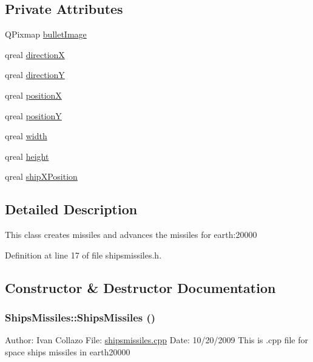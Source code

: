 \subsection*{Private Attributes}
\begin{DoxyCompactItemize}
\item 
QPixmap \hyperlink{class_ships_missiles_a4c2fdc36a57d2e2cd4676f254aaa84d8}{bulletImage}
\item 
qreal \hyperlink{class_ships_missiles_aad45d407d327d29bd616ca336197fe30}{directionX}
\item 
qreal \hyperlink{class_ships_missiles_af7e77e3dd68cb9f8d6cb90467a2a3ff0}{directionY}
\item 
qreal \hyperlink{class_ships_missiles_ad7c34c9db83c3ed6ecca7ec25c119123}{positionX}
\item 
qreal \hyperlink{class_ships_missiles_ace3adf616edc81579fcfd0b2dc76496f}{positionY}
\item 
qreal \hyperlink{class_ships_missiles_a335b53cf15200f696ba3c8cdd9b38d85}{width}
\item 
qreal \hyperlink{class_ships_missiles_a1a31e013e3e81f518aa8f99bbb684357}{height}
\item 
qreal \hyperlink{class_ships_missiles_a728619287aa81ab7bcbdbd034d1c3c8a}{shipXPosition}
\end{DoxyCompactItemize}


\subsection{Detailed Description}
This class creates missiles and advances the missiles for earth:20000 

Definition at line 17 of file shipsmissiles.h.

\subsection{Constructor \& Destructor Documentation}
\hypertarget{class_ships_missiles_ae2a320ddf054587cd0ebcb64267e0294}{
\subsubsection[{ShipsMissiles}]{\setlength{\rightskip}{0pt plus 5cm}ShipsMissiles::ShipsMissiles ()}}
\label{class_ships_missiles_ae2a320ddf054587cd0ebcb64267e0294}
Author: Ivan Collazo File: \hyperlink{shipsmissiles_8cpp}{shipsmissiles.cpp} Date: 10/20/2009 This is .cpp file for space ships missiles in earth20000

